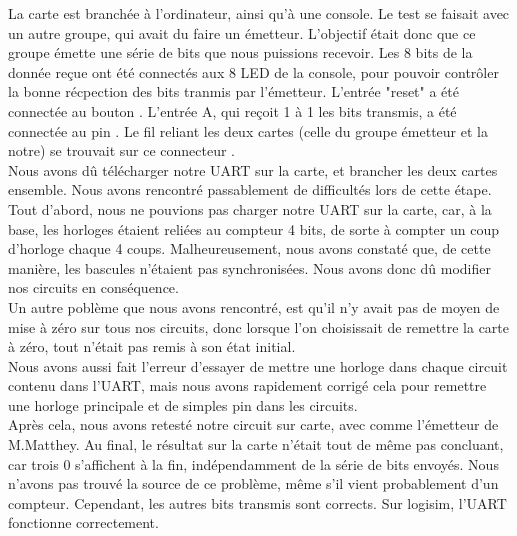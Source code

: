 \documentclass[a4paper]{article} %
\begin{document}
\begin{tcolorbox}[colframe=Monokaimagenta,colback=white]
La carte est branchée à l'ordinateur, ainsi qu'à une console. Le test se faisait avec un autre groupe, qui avait du faire un émetteur. L'objectif était donc que ce groupe émette une série de bits que nous puissions recevoir.
Les 8 bits de la donnée reçue ont été connectés aux 8 LED de la console, pour pouvoir contrôler la bonne récpection des bits tranmis par l'émetteur. L'entrée "reset" a été connectée au bouton . L'entrée A, qui reçoit 1 à 1 les bits transmis, a été connectée au pin . Le fil reliant les deux cartes (celle du groupe émetteur et la notre) se trouvait sur ce connecteur .\\
Nous avons dû télécharger notre UART sur la carte, et brancher les deux cartes ensemble.
Nous avons rencontré passablement de difficultés lors de cette étape. Tout d'abord, nous ne pouvions pas charger notre UART sur la carte, car, à la base, les horloges étaient reliées au compteur 4 bits, de sorte à compter un coup d'horloge chaque 4 coups. Malheureusement, nous avons constaté que, de cette manière, les bascules n'étaient pas synchronisées. Nous avons donc dû modifier nos circuits en conséquence.\\
Un autre poblème que nous avons rencontré, est qu'il n'y avait pas de moyen de mise à zéro sur tous nos circuits, donc lorsque l'on choisissait de remettre la carte à zéro, tout n'était pas remis à son état initial.\\
Nous avons aussi fait l'erreur d'essayer de mettre une horloge dans chaque circuit contenu dans l'UART, mais nous avons rapidement corrigé cela pour remettre une horloge principale et de simples pin dans les circuits.\\
Après cela, nous avons retesté notre circuit sur carte, avec comme l'émetteur de M.Matthey. Au final, le résultat sur la carte n'était tout de même pas concluant, car trois $0$ s'affichent à la fin, indépendamment de la série de bits envoyés. Nous n'avons pas trouvé la source de ce problème, même s'il vient probablement d'un compteur. Cependant, les autres bits transmis sont corrects. Sur logisim, l'UART fonctionne correctement.

\end{tcolorbox}
\end{document}
